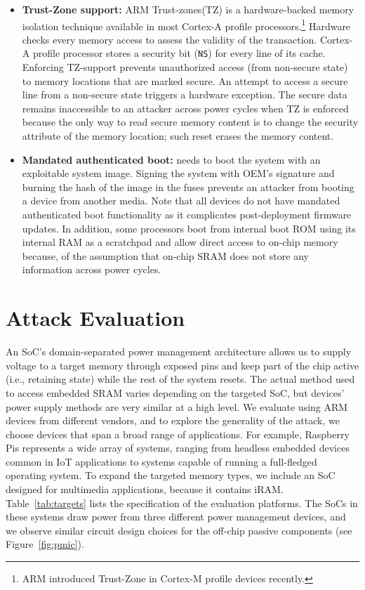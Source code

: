 \begin{itemize}
\item{\textbf{Trust-Zone support:}}
ARM Trust-zones(TZ) is a hardware-backed memory isolation technique available in most Cortex-A profile processors.\footnote{ARM introduced Trust-Zone in Cortex-M profile devices recently.}
Hardware checks every memory access to assess the validity of the transaction.  
Cortex-A profile processor stores a security bit (\lstinline{NS}) for every line of its cache. 
Enforcing TZ-support prevents unauthorized access (from non-secure state) to memory locations that are marked secure. An attempt to access a secure line from a non-secure state triggers a hardware exception.
The secure data remains inaccessible to an attacker across power cycles when TZ is enforced because the only way to read secure memory content is to change the security attribute of the memory location; such reset erases the memory content.

\item{\textbf{Mandated authenticated boot:}}
\sys{} needs to boot the system with an exploitable system image. 
Signing the system with OEM's signature and burning the hash of the image in the fuses prevents an attacker from booting a device from another media. 
Note that all devices do not have mandated authenticated boot functionality as it complicates post-deployment firmware updates.
In addition, some processors boot from internal boot ROM using its internal RAM as a scratchpad and allow direct access to on-chip memory because, of the assumption that on-chip SRAM does not store any information across power cycles.

\end{itemize}
\section{Attack Evaluation}
\label{sec_attack_evaluation}

An SoC's domain-separated power management architecture allows us to supply voltage to a target memory through exposed pins and keep part of the chip active (i.e., retaining state) while the rest of the system resets. 
The actual method used to access embedded SRAM varies depending on the targeted SoC, but devices' power supply methods are very similar at a high level. 
We evaluate \sys{} using ARM devices from different vendors, and to explore the generality of the attack, we choose devices that span a broad range of applications. 
For example, Raspberry Pis represents a wide array of systems, ranging from headless embedded devices common in IoT applications to systems capable of running a full-fledged operating system. 
To expand the targeted memory types, we include an SoC designed for multimedia applications, because it contains iRAM. 
Table~\ref{tab:targets} lists the specification of the evaluation platforms.
The SoCs in these systems draw power from three different power management devices, and we observe similar circuit design choices for the off-chip passive components (see Figure~\ref{fig:pmic}).

